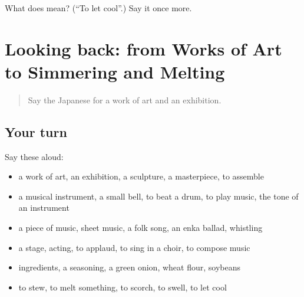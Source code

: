 \begin{tcolorbox}[breakable,colback=teal!4,colframe=teal!35!black,title={Before you move on}]
What does  mean? (\textquotedblleft{}To let cool\textquotedblright{}.) Say it once more.
\end{tcolorbox}
\section[(dialogue)]{Looking back: from Works of Art to Simmering and Melting}

\label{lesson:JA-R473-review-468-473}



\begin{quote}
Say the Japanese for a work of art and an exhibition.
\end{quote}

\subsection*{Your turn}
Say these aloud:

\begin{itemize}
\raggedright
  \item a work of art, an exhibition, a sculpture, a masterpiece, to assemble
  \item a musical instrument, a small bell, to beat a drum, to play music, the tone of an instrument
  \item a piece of music, sheet music, a folk song, an enka ballad, whistling
  \item a stage, acting, to applaud, to sing in a choir, to compose music
  \item ingredients, a seasoning, a green onion, wheat flour, soybeans
  \item to stew, to melt something, to scorch, to swell, to let cool
\end{itemize}

